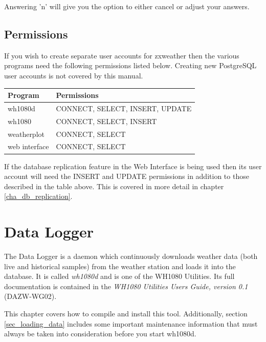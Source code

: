 \documentclass[a4paper,10pt,draft]{book}
\begin{document}
Answering 'n' will give you the option to either cancel or adjust your answers.

\section{Permissions}
If you wish to create separate user accounts for zxweather then the various programs need the following permissions listed below. Creating new PostgreSQL user accounts is not covered by this manual.

\begin{tabular}{l l}
\hline
\textbf{Program} & \textbf{Permissions} \\
\hline
wh1080d & CONNECT, SELECT, INSERT, UPDATE \\
wh1080 & CONNECT, SELECT, INSERT \\
weatherplot & CONNECT, SELECT \\
web interface & CONNECT, SELECT \\
\hline
\end{tabular}

If the database replication feature in the Web Interface is being used then its user account will need the INSERT and UPDATE permissions in addition to those described in the table above. This is covered in more detail in chapter \ref{cha_db_replication}.


\chapter{Data Logger}
\label{cha_data_logger}

The Data Logger is a daemon which continuously downloads weather data (both live and historical samples) from the weather station and loads it into the database. It is called \emph{wh1080d} and is one of the WH1080 Utilities. Its full documentation is contained in the \emph{WH1080 Utilities Users Guide, version 0.1} (DAZW-WG02).

This chapter covers how to compile and install this tool. Additionally, section \ref{sec_loading_data} includes some important maintenance information that must always be taken into consideration before you start wh1080d.
\end{document}
